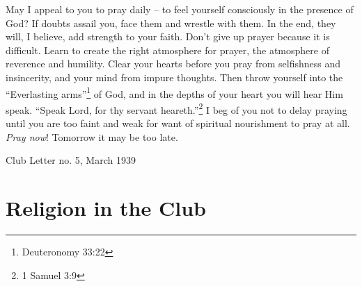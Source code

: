 \documentclass[14pt, article, extrafontsizes, twopage, a4paper]{memoir}
\newcommand{\attr}[1]{
  {\raggedleft\smaller#1

  }
}
\begin{document}
May I appeal to you to pray daily -- to feel yourself
consciously in the presence of God? If doubts assail you,
face them and wrestle with them. In the end, they will, I
believe, add strength to your faith. Don't give up prayer
because it is difficult. Learn to create the right atmosphere
for prayer, the atmosphere of reverence and humility.
Clear your hearts before you pray from selfishness and
insincerity, and your mind from impure thoughts. Then
throw yourself into the ``Everlasting arms''\footnote{Deuteronomy 33:22} of God, and in
the depths of your heart you will hear Him speak. ``Speak
Lord, for thy servant heareth.''\footnote{1 Samuel 3:9}
I beg of you not to delay
praying until you are too faint and weak for want of
spiritual nourishment to pray at all. \textsl{Pray now}! Tomorrow
it may be too late.

\attr{Club Letter no. 5, March 1939}

\clearpage
\chapter{Religion in the Club}
\end{document}
